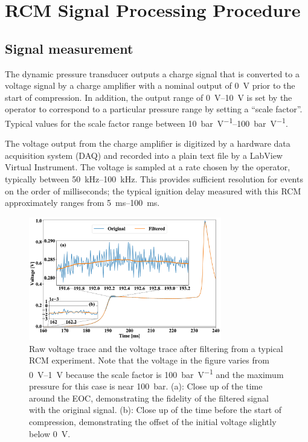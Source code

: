 \documentclass[12pt]{../ussci}
\begin{document}
\section{RCM Signal Processing Procedure}\label{rcm-signal-processing-procedure}

\subsection{Signal measurement}\label{signal-measurement}

The dynamic pressure transducer outputs a charge signal that is
converted to a voltage signal by a charge amplifier with a nominal
output of \SI{0}{\V} prior to the start of compression. In addition, the output
range of \SIrange{0}{10}{\V} is set by the operator to correspond to a
particular pressure range by setting a ``scale factor''. Typical values
for the scale factor range between
\SIrange[range-phrase={ and }]{10}{100}{\bar\per\V}.

The voltage output from the charge amplifier is digitized by a hardware
data acquisition system (DAQ) and recorded into a plain text file by a
LabView Virtual Instrument. The voltage is sampled at a rate chosen by
the operator, typically between \SIrange[range-phrase={ and }]{50}{100}{\kHz}.
This provides sufficient resolution for events on the order of milliseconds; the
typical ignition delay measured with this RCM approximately ranges from
\SIrange{5}{100}{\ms}.

\begin{figure}[htbp]
\centering
\includegraphics[width=0.75\textwidth]{figures/raw-voltage.png}
\caption{Raw voltage trace and the voltage trace after filtering from a typical
RCM experiment. Note that the voltage in the figure varies from
\SIrange{0}{1}{\V} because the scale factor is \SI{100}{\bar\per\V} and the
maximum pressure for this case is near \SI{100}{\bar}. (a): Close up of the
time around the EOC, demonstrating the fidelity of the filtered
signal with the original signal. (b): Close up of the time before the start of
compression, demonstrating the offset of the initial voltage slightly below
\SI{0}{\V}.}
\label{fig:raw-voltage}
\end{figure}
\end{document}
